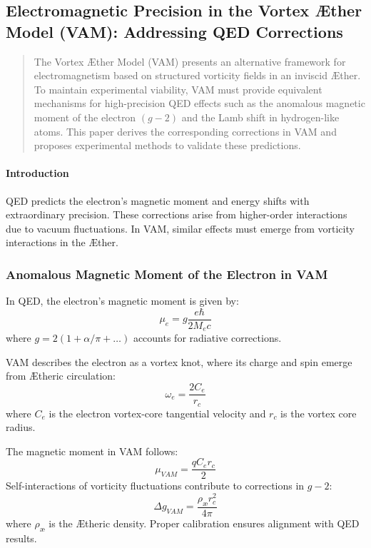 

\subsection{Electromagnetic Precision in the Vortex Æther Model (VAM): Addressing QED Corrections}\label{subsec:electromagnetic-precision-in-the-vortex-ae-ther-model-(vam):-addressing-qed-corrections}


\begin{abstract}
    The Vortex Æther Model (VAM) presents an alternative framework for electromagnetism based on structured vorticity fields in an inviscid Æther. To maintain experimental viability, VAM must provide equivalent mechanisms for high-precision QED effects such as the anomalous magnetic moment of the electron $(g-2)$ and the Lamb shift in hydrogen-like atoms. This paper derives the corresponding corrections in VAM and proposes experimental methods to validate these predictions.
\end{abstract}

\paragraph*{Introduction}
QED predicts the electron's magnetic moment and energy shifts with extraordinary precision. These corrections arise from higher-order interactions due to vacuum fluctuations. In VAM, similar effects must emerge from vorticity interactions in the Æther.

\subsubsection*{Anomalous Magnetic Moment of the Electron in VAM}
In QED, the electron's magnetic moment is given by:
\begin{equation*}
    \mu_e = g \frac{e\hbar}{2M_e c}
\end{equation*}
where $g = 2(1 + \alpha / \pi + \dots)$ accounts for radiative corrections.

VAM describes the electron as a vortex knot, where its charge and spin emerge from Ætheric circulation:
\begin{equation*}
    \omega_e = \frac{2 C_e}{r_c}
\end{equation*}
where $C_e$ is the electron vortex-core tangential velocity and $r_c$ is the vortex core radius.

The magnetic moment in VAM follows:
\begin{equation*}
    \mu_{VAM} = \frac{q C_e r_c}{2}
\end{equation*}
Self-interactions of vorticity fluctuations contribute to corrections in $g-2$:
\begin{equation*}
    \Delta g_{VAM} = \frac{\rho_{\text{\ae}} r_c^2}{4\pi}
\end{equation*}
where $\rho_{\text{\ae}}$ is the Ætheric density. Proper calibration ensures alignment with QED results.

